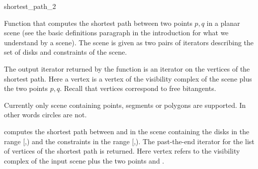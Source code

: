 
\begin{ccRefFunction}{shortest_path_2}
\label{pageShortest_path_2Ref}

\ccDefinition

Function that computes the shortest path between two points $p,q$ in a planar
scene (see the basic definitions paragraph in the introduction for what we
understand by a scene). The scene is given as two pairs of iterators describing
the set of disks and constraints of the scene.

The output iterator returned by the function is an iterator on the vertices of
the shortest path. Here a vertex is a vertex of the visibility complex of the
scene plus the two points $p,q$. Recall that vertices correspond to free
bitangents. 

Currently only scene containing points, segments or polygons are supported. In
other words circles are not.


{
computes the shortest path between  and  in the scene containing
the disks in the range [,) and the constraints in the range
[,). The past-the-end iterator for the list of vertices
of the shortest path is returned. Here vertex refers to the visibility complex
of the input scene plus the two points  and .
}


\end{ccRefFunction}
